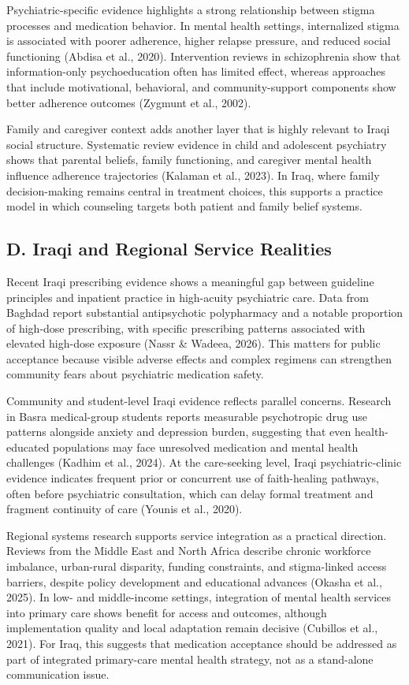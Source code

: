 \documentclass[12pt,a4paper]{article}
\begin{document}
Psychiatric-specific evidence highlights a strong relationship between stigma processes and medication behavior. In mental health settings, internalized stigma is associated with poorer adherence, higher relapse pressure, and reduced social functioning (Abdisa et al., 2020). Intervention reviews in schizophrenia show that information-only psychoeducation often has limited effect, whereas approaches that include motivational, behavioral, and community-support components show better adherence outcomes (Zygmunt et al., 2002).

Family and caregiver context adds another layer that is highly relevant to Iraqi social structure. Systematic review evidence in child and adolescent psychiatry shows that parental beliefs, family functioning, and caregiver mental health influence adherence trajectories (Kalaman et al., 2023). In Iraq, where family decision-making remains central in treatment choices, this supports a practice model in which counseling targets both patient and family belief systems.

\subsection*{D. Iraqi and Regional Service Realities}
Recent Iraqi prescribing evidence shows a meaningful gap between guideline principles and inpatient practice in high-acuity psychiatric care. Data from Baghdad report substantial antipsychotic polypharmacy and a notable proportion of high-dose prescribing, with specific prescribing patterns associated with elevated high-dose exposure (Nassr \& Wadeea, 2026). This matters for public acceptance because visible adverse effects and complex regimens can strengthen community fears about psychiatric medication safety.

Community and student-level Iraqi evidence reflects parallel concerns. Research in Basra medical-group students reports measurable psychotropic drug use patterns alongside anxiety and depression burden, suggesting that even health-educated populations may face unresolved medication and mental health challenges (Kadhim et al., 2024). At the care-seeking level, Iraqi psychiatric-clinic evidence indicates frequent prior or concurrent use of faith-healing pathways, often before psychiatric consultation, which can delay formal treatment and fragment continuity of care (Younis et al., 2020).

Regional systems research supports service integration as a practical direction. Reviews from the Middle East and North Africa describe chronic workforce imbalance, urban-rural disparity, funding constraints, and stigma-linked access barriers, despite policy development and educational advances (Okasha et al., 2025). In low- and middle-income settings, integration of mental health services into primary care shows benefit for access and outcomes, although implementation quality and local adaptation remain decisive (Cubillos et al., 2021). For Iraq, this suggests that medication acceptance should be addressed as part of integrated primary-care mental health strategy, not as a stand-alone communication issue.
\end{document}
